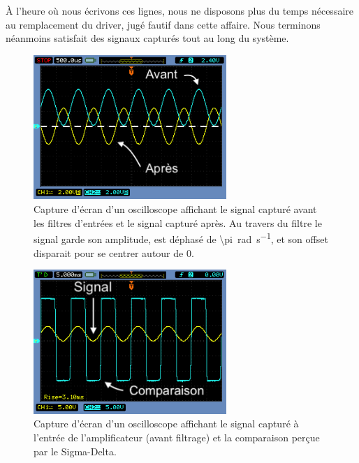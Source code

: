 \documentclass[10pt, oneside, a4paper]{article}
\begin{document}
À l'heure où nous écrivons ces lignes, nous ne disposons plus du temps nécessaire au remplacement du driver, jugé fautif dans cette affaire.
Nous terminons néanmoins satisfait des signaux capturés tout au long du système.


\pagebreak
\begin{figure}[p]
    \centering
    \includegraphics[width=0.65\textwidth]{image/osci-post-filters.png}
    \caption{Capture d'écran d'un oscilloscope affichant le signal capturé avant les
             filtres d'entrées et le signal capturé après.
             Au travers du filtre le signal garde son amplitude, est déphasé de
             \SI{\pi}{\radian\per\second}, et son offset disparait pour se centrer autour
             de 0.}
    \label{fig:osci-post-filters}
\end{figure}

\begin{figure}[p]
    \centering
    \includegraphics[width=0.65\textwidth]{image/osci-compar.png}
    \caption{Capture d'écran d'un oscilloscope affichant le signal capturé à l'entrée
             de l'amplificateur (avant filtrage) et la comparaison perçue par le
             Sigma-Delta.}
    \label{fig:osci-compar}
\end{figure}
\end{document}

